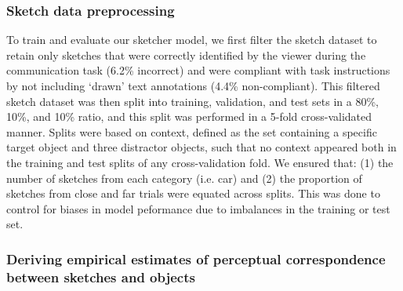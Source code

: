 \documentclass[9pt,twocolumn,twoside]{pnas-new}
\begin{document}
{%

\subsubsection*{Sketch data preprocessing} 
To train and evaluate our sketcher model, we first filter the sketch dataset to retain only sketches that were correctly identified by the viewer during the communication task (6.2\% incorrect) and were compliant with task instructions by not including `drawn' text annotations (4.4\% non-compliant). 
This filtered sketch dataset was then split into training, validation, and test sets in a 80\%, 10\%, and 10\% ratio, and this split was performed in a 5-fold cross-validated manner.
Splits were based on context, defined as the set containing a specific target object and three distractor objects, such that no context appeared both in the training and test splits of any cross-validation fold. 
We ensured that: (1) the number of sketches from each category (i.e. car) and (2) the proportion of sketches from close and far trials were equated across splits. 
This was done to control for biases in model peformance due to imbalances in the training or test set.

\subsubsection*{Deriving empirical estimates of perceptual correspondence between sketches and objects}

}
\end{document}
